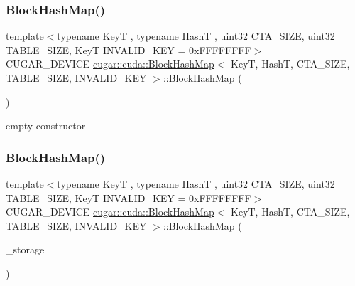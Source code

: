 \subsubsection{\texorpdfstring{Block\+Hash\+Map()}{BlockHashMap()}\hspace{0.1cm}{\footnotesize\ttfamily [1/2]}}
{\footnotesize\ttfamily template$<$typename KeyT , typename HashT , uint32 C\+T\+A\+\_\+\+S\+I\+ZE, uint32 T\+A\+B\+L\+E\+\_\+\+S\+I\+ZE, KeyT I\+N\+V\+A\+L\+I\+D\+\_\+\+K\+EY = 0x\+F\+F\+F\+F\+F\+F\+FF$>$ \\
C\+U\+G\+A\+R\+\_\+\+D\+E\+V\+I\+CE \hyperlink{structcugar_1_1cuda_1_1_block_hash_map}{cugar\+::cuda\+::\+Block\+Hash\+Map}$<$ KeyT, HashT, C\+T\+A\+\_\+\+S\+I\+ZE, T\+A\+B\+L\+E\+\_\+\+S\+I\+ZE, I\+N\+V\+A\+L\+I\+D\+\_\+\+K\+EY $>$\+::\hyperlink{structcugar_1_1cuda_1_1_block_hash_map}{Block\+Hash\+Map} (\begin{DoxyParamCaption}{ }\end{DoxyParamCaption})\hspace{0.3cm}{\ttfamily [inline]}}

empty constructor \mbox{\label{structcugar_1_1cuda_1_1_block_hash_map_abf5f1d2196ccc4cba94c0d4bb7d11265}} 
\subsubsection{\texorpdfstring{Block\+Hash\+Map()}{BlockHashMap()}\hspace{0.1cm}{\footnotesize\ttfamily [2/2]}}
{\footnotesize\ttfamily template$<$typename KeyT , typename HashT , uint32 C\+T\+A\+\_\+\+S\+I\+ZE, uint32 T\+A\+B\+L\+E\+\_\+\+S\+I\+ZE, KeyT I\+N\+V\+A\+L\+I\+D\+\_\+\+K\+EY = 0x\+F\+F\+F\+F\+F\+F\+FF$>$ \\
C\+U\+G\+A\+R\+\_\+\+D\+E\+V\+I\+CE \hyperlink{structcugar_1_1cuda_1_1_block_hash_map}{cugar\+::cuda\+::\+Block\+Hash\+Map}$<$ KeyT, HashT, C\+T\+A\+\_\+\+S\+I\+ZE, T\+A\+B\+L\+E\+\_\+\+S\+I\+ZE, I\+N\+V\+A\+L\+I\+D\+\_\+\+K\+EY $>$\+::\hyperlink{structcugar_1_1cuda_1_1_block_hash_map}{Block\+Hash\+Map} (\begin{DoxyParamCaption}\item[{\hyperlink{structcugar_1_1cuda_1_1_block_hash_map_1_1_temp_storage}{Temp\+Storage} \&}]{\+\_\+storage }\end{DoxyParamCaption})\hspace{0.3cm}{\ttfamily [inline]}}

